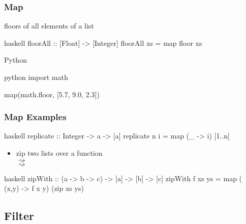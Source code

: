 \documentclass[dvipsnames]{beamer}
\theoremstyle{plain}
\begin{document}
\begin{frame}[fragile]
  \frametitle{Map}

  \begin{exampleblock}{floors of all elements of a list}
    \begin{pygments}{haskell}
floorAll :: [Float] -> [Integer]
floorAll xs = map floor xs
    \end{pygments}
  \end{exampleblock}

  \bigskip
  \begin{exampleblock}{Python}
    \begin{pygments}{python}
import math

map(math.floor, [5.7, 9.0, 2.3])
    \end{pygments}
  \end{exampleblock}
\end{frame}

\begin{frame}[fragile]
  \frametitle{Map Examples}

  \begin{exampleblock}{}
    \begin{pygments}{haskell}
replicate :: Integer -> a -> [a]
replicate n i = map (\_ -> i) [1..n]
    \end{pygments}
  \end{exampleblock}

  \pause
  \begin{itemize}
    \item zip two lists over a function\\
       $\rightsquigarrow$
      \\
       $\rightsquigarrow$
  \end{itemize}

  \begin{exampleblock}{}
    \begin{pygments}{haskell}
zipWith :: (a -> b -> c) -> [a] -> [b] -> [c]
zipWith f xs ys = map (\\(x,y) -> f x y) (zip xs ys)
    \end{pygments}
  \end{exampleblock}
\end{frame}

\subsection{Filter}
\end{document}
